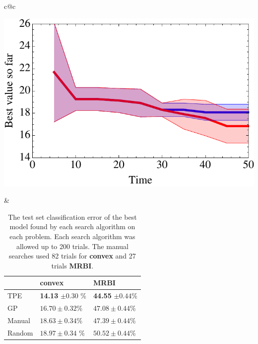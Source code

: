 \documentclass{article}
\newcommand{\vs}[1]{\vspace*{-#1mm}}
\begin{document}
\begin{table}[t]
\vs{2}
\begin{center}
\begin{tabular}{c@{}c}
\begin{minipage}{0.43\linewidth}
\begin{center}
\includegraphics[scale=.39]{figures/bostonHousing.pdf}
\vs{3}
\end{center}
\end{minipage}
&
\hspace*{6mm}\begin{minipage}{0.45\linewidth}
    \begin{center}
    \begin{tabular}{lll}
                & {\bf convex} & {\bf MRBI} \\
        \hline
        TPE & {\bf 14.13} $ \pm 0.30$ \% & {\bf 44.55} $ \pm 0.44$\%   \\
        GP & $ 16.70 \pm 0.32$\% &  $ 47.08\pm 0.44 $\% \\
        Manual & $18.63 \pm 0.34$\%  &  $47.39 \pm 0.44$\%  \\
        Random &  $ 18.97\pm 0.34$ \%  & $50.52 \pm 0.44$\% \\
        \hline
    \end{tabular}
    \end{center}
    \caption{The test set classification error of the best model found by each search algorithm on each problem.
    Each search algorithm was allowed up to 200 trials.
    The manual searches used 82 trials for {\bf convex}
    and 27 trials {\bf MRBI}.
    \label{tbl:testerr}
    }
\end{minipage}
\end{tabular}
\end{center}
\vs{6}
\end{table}
\end{document}
